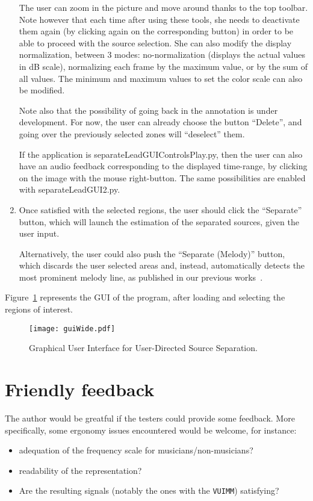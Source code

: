 \documentclass{article}
\begin{document}
\begin{enumerate}
   The user can zoom in the picture and move around thanks to the top
   toolbar. Note however that each time after using these tools, she
   needs to deactivate them again (by clicking again on the corresponding
   button) in order to be able to proceed with the source selection.
   She can also modify the display normalization, between 3 modes: 
   no-normalization (displays the actual values in dB scale), normalizing
   each frame by the maximum value, or by the sum of all values. The minimum
   and maximum values to set the color scale can also be modified.
   
   Note also that the possibility of going back in the annotation is under
   development. For now, the user can already choose the button ``Delete'',
   and going over the previously selected zones will ``deselect'' them.
   
   If the application is separateLeadGUIControlsPlay.py, then the user can 
   also have an audio feedback corresponding to the displayed time-range,
   by clicking on the image with the mouse right-button. The same 
   possibilities are enabled with separateLeadGUI2.py.

\item Once satisfied with the selected regions, the user should click the
   ``Separate'' button, which will launch the estimation of the separated
   sources, given the user input. 
   
   Alternatively, the user could also push the ``Separate (Melody)'' button,
   which discards the user selected areas and, instead, automatically detects
   the most prominent melody line, as published in our previous works~\cite{Durrieu2010}.
\end{enumerate}

Figure~\ref{fig:interface} represents the GUI of the program, after loading and selecting the regions of interest.

\begin{figure}
\texttt{[image: guiWide.pdf]}
\caption{Graphical User Interface for User-Directed Source Separation.}
\label{fig:interface}
\end{figure}

\section{Friendly feedback}

The author would be greatful if the testers could provide some feedback.
More specifically, some ergonomy issues encountered would be welcome, for
instance:
\begin{itemize}
\item    adequation of the frequency scale for musicians/non-musicians?
\item    readability of the representation?
\item    Are the resulting signals (notably the ones with the \texttt{VUIMM}) satisfying?
\end{itemize}
\end{document}
